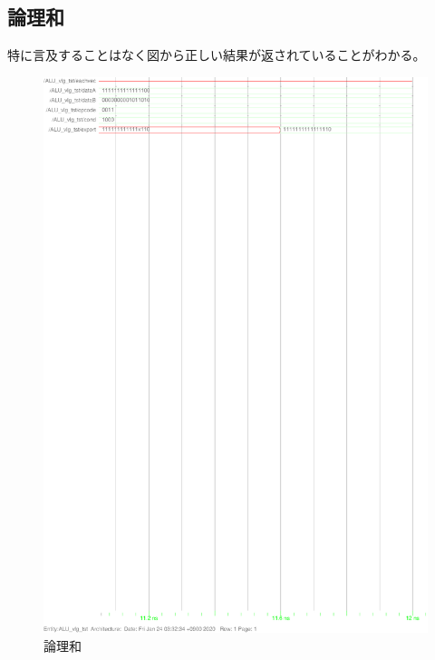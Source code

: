\documentclass{jsarticle}
\begin{document}
\subsection{論理和}
特に言及することはなく図から正しい結果が返されていることがわかる。
\begin{figure}
    \caption{論理和}
  \includegraphics[scale=0.8]{ALU_or.ps}
\end{figure}
\end{document}
